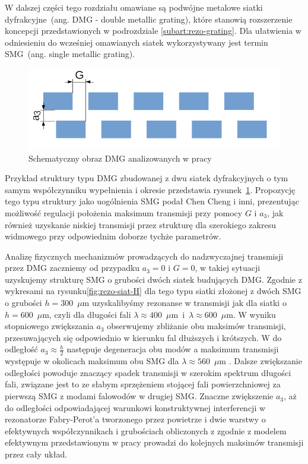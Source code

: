 W dalszej części tego rozdziału omawiane są podwójne metalowe siatki dyfrakcyjne~(ang. DMG - double metallic grating),  które stanowią rozszerzenie koncepcji przedstawionych w podrozdziale \ref{subart:rezo-grating}. Dla ułatwienia w odniesieniu do wcześniej omawianych siatek wykorzystywany jest termin SMG~(ang. single metallic grating).

\begin{figure}[tb]
	\includegraphics[width=\textwidth]{images/dmg/dmg_general_schem.png}
	\caption{Schematyczny obraz DMG analizowanych w pracy \cite{cheng2007controllable}}
	\label{fig:cheng_dmg_schem}
\end{figure}

Przykład struktury typu DMG zbudowanej z dwu siatek dyfrakcyjnych o tym samym współczynniku wypełnienia i okresie przedstawia rysunek~\ref{fig:cheng_dmg_schem}. Propozycję tego typu struktury jako uogólnienia SMG podał Chen Cheng i inni\cite{cheng2007controllable}, prezentując możliwość regulacji położenia maksimum transmisji przy pomocy $G$ i $a_3$, jak również uzyskanie niskiej transmisji przez strukturę dla szerokiego zakresu widmowego przy odpowiednim doborze tychże parametrów. 

Analizę fizycznych mechanizmów prowadzących do nadzwyczajnej transmisji przez DMG zaczniemy od przypadku $a_3=0$ i $G=0$, w takiej sytuacji uzyskujemy strukturę SMG o grubości dwóch siatek budujących DMG. Zgodnie z wykresami na rysunku\ref{fig:rezo-siat-H} dla tego typu siatki złożonej z dwóch SMG o grubości $h=300$~$\mu$m uzyskalibyśmy rezonanse w transmisji jak dla siatki o $h=600$~$\mu$m, czyli dla długości fali $\lambda \approx 400$~$\mu$m~i~$\lambda \approx 600$~$\mu$m. W wyniku stopniowego zwiększania $a_3$ obserwujemy zbliżanie obu maksimów transmisji, przesuwających się odpowiednio w kierunku fal dłuższych i krótszych. W do odległość $a_3 \approx \frac{h}{2}$ następuje degeneracja obu modów a maksimum transmisji występuje w okolicach maksimum obu SMG dla $\lambda \approx 560$~$\mu$m \cite{cheng2008physical}. Dalsze zwiększanie odległości powoduje znaczący spadek transmisji w szerokim spektrum długości fali, związane jest to ze słabym sprzężeniem stojącej fali powierzchniowej za pierwszą SMG z modami falowodów w drugiej SMG. Znaczne zwiększenie $a_3$, aż do odległości odpowiadającej warunkowi konstruktywnej interferencji w rezonatorze Fabry-Perot'a tworzonego przez powietrze i dwie warstwy o efektywnych współczynnikach i grubościach obliczonych z zgodnie z modelem efektywnym przedstawionym w pracy \cite{shen2005mechanism} prowadzi do kolejnych maksimów transmisji przez cały układ.

